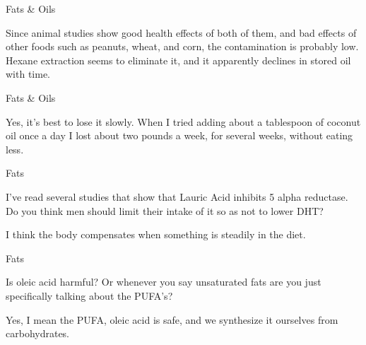 \documentclass[11pt,oneside,openany,extrafontsizes]{memoir}
\begin{document}
\begin{standalonequote}{Fats \& Oils}

    \begin{answer}
        Since animal studies show good health effects of both of them, and bad effects of other foods such as peanuts, wheat, and corn, the contamination is probably low. Hexane extraction seems to eliminate it, and it apparently declines in stored oil with time.
    \end{answer}
\end{standalonequote}

\begin{standalonequote}{Fats \& Oils}

    \begin{answer}
        Yes, it's best to lose it slowly. When I tried adding about a tablespoon of coconut oil once a day I lost about two pounds a week, for several weeks, without eating less.
    \end{answer}
\end{standalonequote}

\begin{qaexchange}{Fats}

    \begin{question}
        I've read several studies that show that Lauric Acid inhibits 5 alpha reductase. Do you think men should limit their intake of it so as not to lower DHT?
    \end{question}

    \begin{answer}
        I think the body compensates when something is steadily in the diet.
    \end{answer}
\end{qaexchange}

\begin{qaexchange}{Fats}

    \begin{question}
        Is oleic acid harmful? Or whenever you say unsaturated fats are you just specifically talking about the PUFA's?
    \end{question}

    \begin{answer}
        Yes, I mean the PUFA, oleic acid is safe, and we synthesize it ourselves from carbohydrates.
    \end{answer}
\end{qaexchange}
\end{document}
